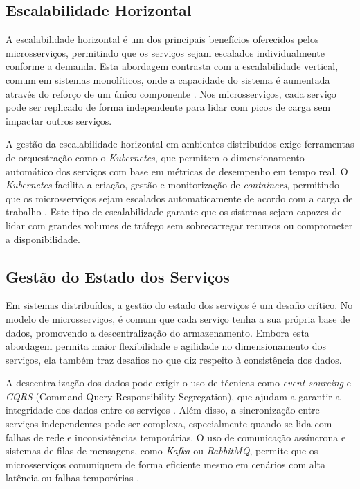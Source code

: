\subsection{Escalabilidade Horizontal}

A escalabilidade horizontal é um dos principais benefícios oferecidos pelos microsserviços, permitindo que os serviços sejam escalados individualmente conforme a demanda. Esta abordagem contrasta com a escalabilidade vertical, comum em sistemas monolíticos, onde a capacidade do sistema é aumentada através do reforço de um único componente \cite{Blinowski2022}. Nos microsserviços, cada serviço pode ser replicado de forma independente para lidar com picos de carga sem impactar outros serviços.

A gestão da escalabilidade horizontal em ambientes distribuídos exige ferramentas de orquestração como o \textit{Kubernetes}, que permitem o dimensionamento automático dos serviços com base em métricas de desempenho em tempo real. O \textit{ Kubernetes} facilita a criação, gestão e monitorização de \textit{containers}, permitindo que os microsserviços sejam escalados automaticamente de acordo com a carga de trabalho \cite{Rocha2023}. Este tipo de escalabilidade garante que os sistemas sejam capazes de lidar com grandes volumes de tráfego sem sobrecarregar recursos ou comprometer a disponibilidade.

\subsection{Gestão do Estado dos Serviços}

Em sistemas distribuídos, a gestão do estado dos serviços é um desafio crítico. No modelo de microsserviços, é comum que cada serviço tenha a sua própria base de dados, promovendo a descentralização do armazenamento. Embora esta abordagem permita maior flexibilidade e agilidade no dimensionamento dos serviços, ela também traz desafios no que diz respeito à consistência dos dados.

A descentralização dos dados pode exigir o uso de técnicas como \textit{event sourcing} e \textit{CQRS} (Command Query Responsibility Segregation), que ajudam a garantir a integridade dos dados entre os serviços \cite{Richardson2018}. Além disso, a sincronização entre serviços independentes pode ser complexa, especialmente quando se lida com falhas de rede e inconsistências temporárias. O uso de comunicação assíncrona e sistemas de filas de mensagens, como \textit{ Kafka} ou \textit{ RabbitMQ}, permite que os microsserviços comuniquem de forma eficiente mesmo em cenários com alta latência ou falhas temporárias \cite{Dragoni2017}.


